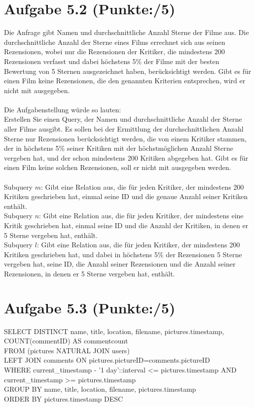 \documentclass[11pt, a4paper]{article}
\newcommand{\blattnummer}{5}
\newcommand{\pp}{5}
\newcommand{\ppp}{5}
\newcommand{\aufgabe}[2] {\section*{Aufgabe \blattnummer.#1 (Punkte:\qquad/#2)}}
\begin{document}
\aufgabe{2}{\pp}
\begin{adjustwidth}{20pt}{20pt}
Die Anfrage gibt Namen und durchschnittliche Anzahl Sterne der Filme aus. Die durchschnittliche Anzahl der Sterne eines Films errechnet sich aus seinen Rezensionen, wobei nur die Rezensionen der Kritiker, die mindestens 200 Rezensionen verfasst und dabei höchstens 5\% der Filme mit der besten Bewertung von 5 Sternen ausgezeichnet haben, berücksichtigt werden. Gibt es für einen Film keine Rezensionen, die den genannten Kriterien entsprechen, wird er nicht mit ausgegeben.\\ \ \\
Die Aufgabenstellung würde so lauten:\\
\glqq Erstellen Sie einen Query, der Namen und durchschnittliche Anzahl der Sterne aller Filme ausgibt. Es sollen bei der Ermittlung der durchschnittlichen Anzahl Sterne nur Rezensionen berücksichtigt werden, die von einem Kritiker stammen, der in höchstens 5\% seiner Kritiken mit der höchstmöglichen Anzahl Sterne vergeben hat, und der schon mindestens 200 Kritiken abgegeben hat. Gibt es für einen Film keine solchen Rezensionen, soll er nicht mit ausgegeben werden.\grqq\\ \ \\
Subquery $m$: Gibt eine Relation aus, die für jeden Kritiker, der mindestens 200 Kritiken geschrieben hat, einmal seine ID und die genaue Anzahl seiner Kritiken enthält.\\
Subquery $n$: Gibt eine Relation aus, die für jeden Kritiker, der mindestens eine Kritik geschrieben hat, einmal seine ID und die Anzahl der Kritiken, in denen er 5 Sterne vergeben hat, enthält.\\
Subquery $l$: Gibt eine Relation aus, die für jeden Kritiker, der mindestens 200 Kritiken geschrieben hat, und dabei in höchstens 5\% der Rezensionen 5 Sterne vergeben hat, seine ID, die Anzahl seiner Rezensionen und die Anzahl seiner Rezensionen, in denen er 5 Sterne vergeben hat, enthält.
\end{adjustwidth}



\aufgabe{3}{\ppp}
\begin{adjustwidth}{20pt}{20pt}
\begin{tt}
SELECT DISTINCT name, title, location, filename, pictures.timestamp, COUNT(commentID) AS commentcount\\
FROM (pictures NATURAL JOIN users) \\LEFT JOIN comments ON pictures.pictureID=comments.pictureID\\
WHERE current\_timestamp - '1 day'::interval <= pictures.timestamp AND current\_timestamp >= pictures.timestamp\\
GROUP BY name, title, location, filename, pictures.timestamp\\
ORDER BY pictures.timestamp DESC
\end{tt}
\end{adjustwidth}


\end{document}
